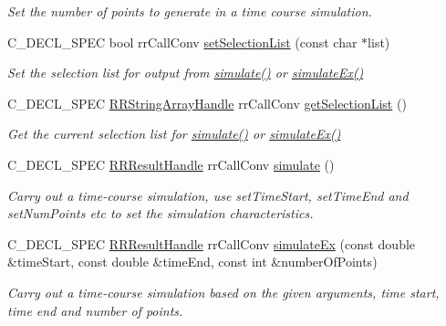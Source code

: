 \begin{DoxyCompactItemize}
\begin{DoxyCompactList}\small\item\em \-Set the number of points to generate in a time course simulation. \end{DoxyCompactList}\item 
\-C\-\_\-\-D\-E\-C\-L\-\_\-\-S\-P\-E\-C bool rr\-Call\-Conv \hyperlink{group__simulation_ga6465c94b6dfed39a6ef614bd0a68cb9b}{set\-Selection\-List} (const char $\ast$list)
\begin{DoxyCompactList}\small\item\em \-Set the selection list for output from \hyperlink{group__simulation_ga9f0555c11716daec2336d54d13facc57}{simulate()} or \hyperlink{group__simulation_ga9b87919e79f6eb0d7c77c3daa08d6baf}{simulate\-Ex()} \end{DoxyCompactList}\item 
\-C\-\_\-\-D\-E\-C\-L\-\_\-\-S\-P\-E\-C \*
\hyperlink{rr__c__types_8h_a90941a6a2247bf7a8ec3d429729c5f9a}{\-R\-R\-String\-Array\-Handle} rr\-Call\-Conv \hyperlink{group__simulation_ga835e32acf3c2bb23a85ec049e685cc2b}{get\-Selection\-List} ()
\begin{DoxyCompactList}\small\item\em \-Get the current selection list for \hyperlink{group__simulation_ga9f0555c11716daec2336d54d13facc57}{simulate()} or \hyperlink{group__simulation_ga9b87919e79f6eb0d7c77c3daa08d6baf}{simulate\-Ex()} \end{DoxyCompactList}\item 
\-C\-\_\-\-D\-E\-C\-L\-\_\-\-S\-P\-E\-C \hyperlink{rr__c__types_8h_a8c364bbdef9aab31c89655c38461da51}{\-R\-R\-Result\-Handle} \*
rr\-Call\-Conv \hyperlink{group__simulation_ga9f0555c11716daec2336d54d13facc57}{simulate} ()
\begin{DoxyCompactList}\small\item\em \-Carry out a time-\/course simulation, use set\-Time\-Start, set\-Time\-End and set\-Num\-Points etc to set the simulation characteristics. \end{DoxyCompactList}\item 
\-C\-\_\-\-D\-E\-C\-L\-\_\-\-S\-P\-E\-C \hyperlink{rr__c__types_8h_a8c364bbdef9aab31c89655c38461da51}{\-R\-R\-Result\-Handle} \*
rr\-Call\-Conv \hyperlink{group__simulation_ga9b87919e79f6eb0d7c77c3daa08d6baf}{simulate\-Ex} (const double \&time\-Start, const double \&time\-End, const int \&number\-Of\-Points)
\begin{DoxyCompactList}\small\item\em \-Carry out a time-\/course simulation based on the given arguments, time start, time end and number of points. \end{DoxyCompactList}\item 

\end{DoxyCompactItemize}
